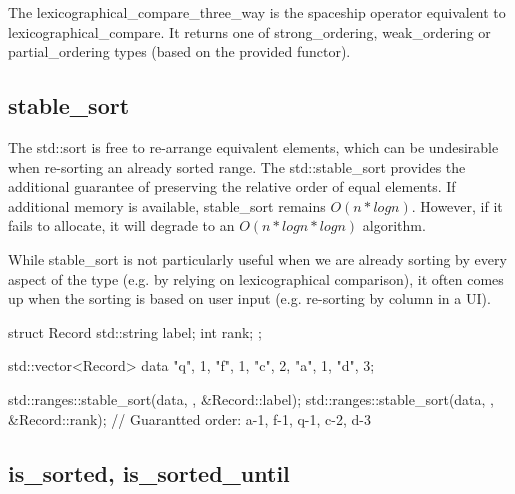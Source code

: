 The lexicographical\_compare\_three\_way is the spaceship operator equivalent to lexicographical\_compare. It returns one of strong\_ordering, weak\_ordering or partial\_ordering types (based on the provided functor).



\subsection{stable\_sort}

The std::sort is free to re-arrange equivalent elements, which can be undesirable when re-sorting an already sorted range. The std::stable\_sort provides the additional guarantee of preserving the relative order of equal elements. If additional memory is available, stable\_sort remains $O(n*logn)$. However, if it fails to allocate, it will degrade to an $O(n*logn*logn)$ algorithm.



While stable\_sort is not particularly useful when we are already sorting by every aspect of the type (e.g. by relying on lexicographical comparison), it often comes up when the sorting is based on user input (e.g. re-sorting by column in a UI).

\begin{box-note}
\begin{cppcode}
struct Record {
    std::string label;
    int rank;
};

std::vector<Record> data {{"q", 1}, {"f", 1}, {"c", 2}, {"a", 1}, {"d", 3}};

std::ranges::stable_sort(data, {}, &Record::label);    
std::ranges::stable_sort(data, {}, &Record::rank);
// Guarantted order: a-1, f-1, q-1, c-2, d-3
\end{cppcode}
\end{box-note}

\subsection{is\_sorted, is\_sorted\_until}

